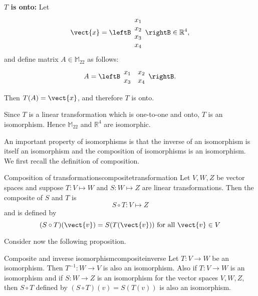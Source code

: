 \begin{solution}
\textbf{$T$ is onto:}
Let
\[ \vect{x}=\leftB\begin{array}{c} x_1\\x_2\\x_3\\x_4 \end{array}\rightB\in\mathbb{R}^4,\]
and
define matrix $A\in\mathbb{M}_{22}$ as follows:
\[ A=\leftB\begin{array}{cc} x_1 & x_2 \\ x_3 & x_4 \end{array}\rightB.\]

Then $T(A)=\vect{x}$, and therefore $T$ is onto.

Since $T$ is a linear transformation which is one-to-one and onto, $T$ is an isomorphism. Hence $\mathbb{M}_{22}$ and $\mathbb{R}^4$ are isomorphic.
\end{solution}

An important property of isomorphisms is that the inverse of an isomorphism
is itself an isomorphism and the composition of isomorphisms is an
isomorphism. We first recall the definition of composition.

\begin{definition}{Composition of transformations}{compositetransformation}
Let $V, W, Z$ be vector spaces and suppose $T: V \mapsto W$ and $S: W \mapsto Z$ are linear transformations. Then the composite of $S$ and $T$ is
\[
S \circ T: V \mapsto Z
\]
and is defined by 
\[
(S \circ T) (\vect{v}) = S(T(\vect{v})) \mbox{ for all } \vect{v} \in V
\]
\end{definition}

Consider now the following proposition.

\begin{proposition}{Composite and inverse isomorphism}{compositeinverse}
Let $T:V\rightarrow W$ be an isomorphism. Then $T^{-1}:W\rightarrow V$ is
also an isomorphism. Also if $T:V\rightarrow W$ is an isomorphism and if $
S:W\rightarrow Z$ is an isomorphism for the vector spaces $V,W,Z,$ then $
S\circ T$ defined by $\left( S\circ T\right) \left( v\right) = S\left(
T\left( v\right) \right) $ is also an isomorphism.
\end{proposition}

